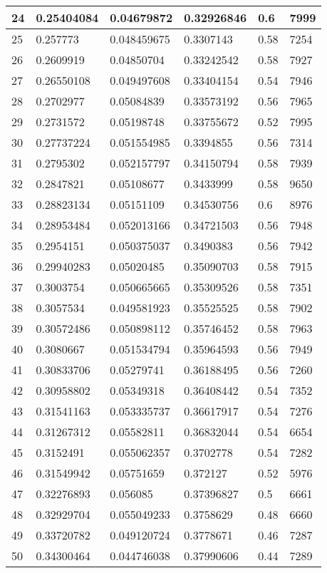 \begin{longtable}{|l|l|l|l|l|l|}
24 & 0.25404084 & 0.04679872 & 0.32926846 & 0.6 & 7999 \\ \hline 
25 & 0.257773 & 0.048459675 & 0.3307143 & 0.58 & 7254 \\ \hline 
26 & 0.2609919 & 0.04850704 & 0.33242542 & 0.58 & 7927 \\ \hline 
27 & 0.26550108 & 0.049497608 & 0.33404154 & 0.54 & 7946 \\ \hline 
28 & 0.2702977 & 0.05084839 & 0.33573192 & 0.56 & 7965 \\ \hline 
29 & 0.2731572 & 0.05198748 & 0.33755672 & 0.52 & 7995 \\ \hline 
30 & 0.27737224 & 0.051554985 & 0.3394855 & 0.56 & 7314 \\ \hline 
31 & 0.2795302 & 0.052157797 & 0.34150794 & 0.58 & 7939 \\ \hline 
32 & 0.2847821 & 0.05108677 & 0.3433999 & 0.58 & 9650 \\ \hline 
33 & 0.28823134 & 0.05151109 & 0.34530756 & 0.6 & 8976 \\ \hline 
34 & 0.28953484 & 0.052013166 & 0.34721503 & 0.56 & 7948 \\ \hline 
35 & 0.2954151 & 0.050375037 & 0.3490383 & 0.56 & 7942 \\ \hline 
36 & 0.29940283 & 0.05020485 & 0.35090703 & 0.58 & 7915 \\ \hline 
37 & 0.3003754 & 0.050665665 & 0.35309526 & 0.58 & 7351 \\ \hline 
38 & 0.3057534 & 0.049581923 & 0.35525525 & 0.58 & 7902 \\ \hline 
39 & 0.30572486 & 0.050898112 & 0.35746452 & 0.58 & 7963 \\ \hline 
40 & 0.3080667 & 0.051534794 & 0.35964593 & 0.56 & 7949 \\ \hline 
41 & 0.30833706 & 0.05279741 & 0.36188495 & 0.56 & 7260 \\ \hline 
42 & 0.30958802 & 0.05349318 & 0.36408442 & 0.54 & 7352 \\ \hline 
43 & 0.31541163 & 0.053335737 & 0.36617917 & 0.54 & 7276 \\ \hline 
44 & 0.31267312 & 0.05582811 & 0.36832044 & 0.54 & 6654 \\ \hline 
45 & 0.3152491 & 0.055062357 & 0.3702778 & 0.54 & 7282 \\ \hline 
46 & 0.31549942 & 0.05751659 & 0.372127 & 0.52 & 5976 \\ \hline 
47 & 0.32276893 & 0.056085 & 0.37396827 & 0.5 & 6661 \\ \hline 
48 & 0.32929704 & 0.055049233 & 0.3758629 & 0.48 & 6660 \\ \hline 
49 & 0.33720782 & 0.049120724 & 0.3778671 & 0.46 & 7287 \\ \hline 
50 & 0.34300464 & 0.044746038 & 0.37990606 & 0.44 & 7289 \\ \hline 
\end{longtable}